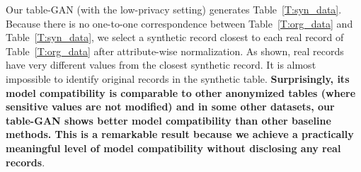 Our table-GAN (with the low-privacy setting) generates Table~\ref{T:syn_data}. Because there is no one-to-one correspondence between Table~\ref{T:org_data} and Table~\ref{T:syn_data}, we select a synthetic record closest to each real record of Table~\ref{T:org_data} after attribute-wise normalization. As shown, real records have very different values from the closest synthetic record. It is almost impossible to identify original records in the synthetic table. \textbf{Surprisingly, its model compatibility is comparable to other anonymized tables (where sensitive values are not modified) and in some other datasets, our table-GAN shows better model compatibility than other baseline methods. This is a remarkable result because we achieve a practically meaningful level of model compatibility without disclosing any real records}.